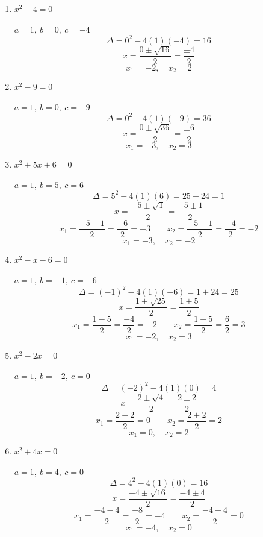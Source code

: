 \documentclass[12pt, a4paper]{article}
\begin{document}
\begin{enumerate}[label=(\alph*)]

    \item $x^2 - 4 = 0$

    $a = 1,\ b = 0,\ c = -4$
    \[
        \Delta = 0^2 - 4(1)(-4) = 16
    \]
    \[
        x = \frac{0 \pm \sqrt{16}}{2} = \frac{\pm 4}{2}
    \]
    \[
        \boxed{x_1 = -2, \quad x_2 = 2}
    \]

    \item $x^2 - 9 = 0$

    $a = 1,\ b = 0,\ c = -9$
    \[
        \Delta = 0^2 - 4(1)(-9) = 36
    \]
    \[
        x = \frac{0 \pm \sqrt{36}}{2} = \frac{\pm 6}{2}
    \]
    \[
        \boxed{x_1 = -3, \quad x_2 = 3}
    \]

    \item $x^2 + 5x + 6 = 0$

    $a = 1,\ b = 5,\ c = 6$
    \[
        \Delta = 5^2 - 4(1)(6) = 25 - 24 = 1
    \]
    \[
        x = \frac{-5 \pm \sqrt{1}}{2} = \frac{-5 \pm 1}{2}
    \]
    \[
        x_1 = \frac{-5 - 1}{2} = \frac{-6}{2} = -3
        \qquad
        x_2 = \frac{-5 + 1}{2} = \frac{-4}{2} = -2
    \]
    \[
        \boxed{x_1 = -3, \quad x_2 = -2}
    \]

    \item $x^2 - x - 6 = 0$

    $a = 1,\ b = -1,\ c = -6$
    \[
        \Delta = (-1)^2 - 4(1)(-6) = 1 + 24 = 25
    \]
    \[
        x = \frac{1 \pm \sqrt{25}}{2} = \frac{1 \pm 5}{2}
    \]
    \[
        x_1 = \frac{1 - 5}{2} = \frac{-4}{2} = -2
        \qquad
        x_2 = \frac{1 + 5}{2} = \frac{6}{2} = 3
    \]
    \[
        \boxed{x_1 = -2, \quad x_2 = 3}
    \]

    \item $x^2 - 2x = 0$

    $a = 1,\ b = -2,\ c = 0$
    \[
        \Delta = (-2)^2 - 4(1)(0) = 4
    \]
    \[
        x = \frac{2 \pm \sqrt{4}}{2} = \frac{2 \pm 2}{2}
    \]
    \[
        x_1 = \frac{2 - 2}{2} = 0
        \qquad
        x_2 = \frac{2 + 2}{2} = 2
    \]
    \[
        \boxed{x_1 = 0, \quad x_2 = 2}
    \]

    \item $x^2 + 4x = 0$

    $a = 1,\ b = 4,\ c = 0$
    \[
        \Delta = 4^2 - 4(1)(0) = 16
    \]
    \[
        x = \frac{-4 \pm \sqrt{16}}{2} = \frac{-4 \pm 4}{2}
    \]
    \[
        x_1 = \frac{-4 - 4}{2} = \frac{-8}{2} = -4
        \qquad
        x_2 = \frac{-4 + 4}{2} = 0
    \]
    \[
        \boxed{x_1 = -4, \quad x_2 = 0}
    \]

\end{enumerate}
\end{document}

